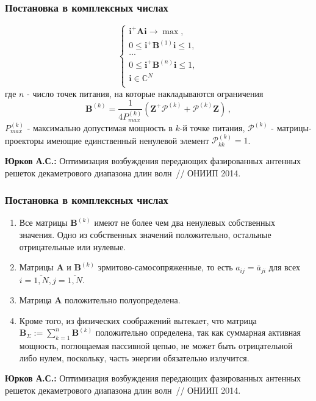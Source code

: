 \begin{frame}
    \frametitle{Постановка в комплексных числах}
   \begin{equation}
        \begin{cases}
           \textbf{i}^{+}\textbf{Ai} \rightarrow \max,\\
           0 \leq \textbf{i}^{+}\textbf{B}^{(1)}\textbf{i} \leq 1, \\
           ...\\
           0 \leq \textbf{i}^{+}\textbf{B}^{(n)}\textbf{i} \leq 1,\\
           \textbf{i} \in \mathbb{C}^N\\
         \end{cases}
         \label{eq:task2}
    \end{equation}
%
где $n$ - число точек питания, на которые накладываются ограничения
%
    \begin{equation}
        \textbf{B}^{(k)} = \frac{1}{4P_{max}^{(k)}}(\textbf{Z}^{+}\mathcal{P}^{(k)} + \mathcal{P}^{(k)}\textbf{Z}) \, ,
    \end{equation}
%
$P_{max}^{(k)}$ - максимально допустимая мощность в $k$-й точке питания, $\mathcal{P}^{(k)}$ - матрицы-проекторы имеющие единственный ненулевой элемент $\mathcal{P}^{(k)}_{kk}=1$.

\vspace{2em}
    \textbf{Юрков А.С.:} Оптимизация возбуждения передающих фазированных антенных решеток декаметрового диапазона длин волн~// ОНИИП 2014.
\end{frame}

\begin{frame}
    \frametitle{Постановка в комплексных числах}
   \begin{enumerate}
  \item Все матрицы $\textbf{B}^{(k)}$ имеют не более чем два ненулевых собственных значения. Одно из собственных значений положительно,
  остальные отрицательные или нулевые.
  \item Матрицы $\textbf{A}$ и $\textbf{B}^{(k)}$ эрмитово-самосопряженные, то есть
  $a_{ij} = \overline{a}_{ji}$ для всех $i = \overline{1,N}, j = \overline{1,N}$.
  \item Матрица $\textbf{A}$ положительно полуопределена.
  \item Кроме того, из физических соображений вытекает, что матрица $\textbf{B}_{\Sigma}:= \sum_{k=1}^{n} \textbf{B}^{(k)}$
  положительно определена, так как суммарная активная мощность, поглощаемая пассивной цепью, не может быть отрицательной либо нулем,
  поскольку, часть энергии обязательно излучится.
\end{enumerate}

\vspace{2em}
    \textbf{Юрков А.С.:} Оптимизация возбуждения передающих фазированных антенных решеток декаметрового диапазона длин волн~// ОНИИП 2014.
\end{frame}

